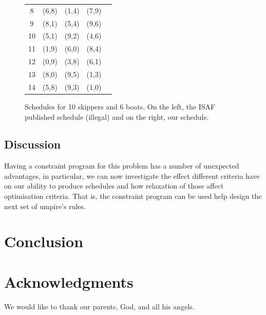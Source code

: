 \documentclass{llncs}
\begin{document}
\begin{center}
\begin{figure}[h]
\begin{minipage}[t]{0.5\textwidth}
\begin{tabular}{ccccc}
8 & (6,8) & (1,4) & (7,9) \\
9 & (8,1) & (5,4) & (9,6) \\ 
10 & (5,1) & (9,2) & (4,6) \\ 
11 & (1,9) & (6,0) & (8,4) \\ 
12 & (0,9) & (3,8) & (6,1) \\ 
13 & (8,0) & (9,5) & (1,3) \\ 
14 & (5,8) & (9,3) & (1,0) \\ \bottomrule 
\end{tabular} 
\label{10-06b}
\end{minipage}
\caption{Schedules for 10 skippers and 6 boats. On the left, the ISAF published schedule (illegal) and on the right, our schedule.}
\label{10-06}
\end{figure}
\end{center}

\subsection{Discussion}
Having a constraint program for this problem has a number of unexpected advantages, in particular, we can now investigate the effect different criteria have on our ability to produce schedules and how relaxation of those affect optimisation criteria. That is, the constraint program can be used help design the next set of umpire's rules.

\section{Conclusion}\label{sec:conclusions}



\section*{Acknowledgments}
We would like to thank our parents, God, and all his angels.



\end{document}
